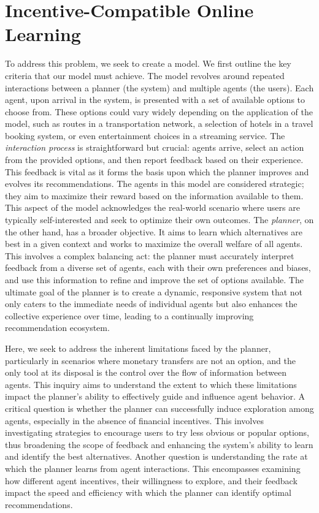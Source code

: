 \documentclass[
  letterpaper,
  numbers=noenddot,
  DIV=11]{scrreprt}
\theoremstyle{definition}
\theoremstyle{plain}
\theoremstyle{plain}
\theoremstyle{remark}
\begin{document}
\section{Incentive-Compatible Online
Learning}\label{incentive-compatible-online-learning}

To address this problem, we seek to create a model. We first outline the
key criteria that our model must achieve. The model revolves around
repeated interactions between a planner (the system) and multiple agents
(the users). Each agent, upon arrival in the system, is presented with a
set of available options to choose from. These options could vary widely
depending on the application of the model, such as routes in a
transportation network, a selection of hotels in a travel booking
system, or even entertainment choices in a streaming service. The
\emph{interaction process} is straightforward but crucial: agents
arrive, select an action from the provided options, and then report
feedback based on their experience. This feedback is vital as it forms
the basis upon which the planner improves and evolves its
recommendations. The agents in this model are considered strategic; they
aim to maximize their reward based on the information available to them.
This aspect of the model acknowledges the real-world scenario where
users are typically self-interested and seek to optimize their own
outcomes. The \emph{planner}, on the other hand, has a broader
objective. It aims to learn which alternatives are best in a given
context and works to maximize the overall welfare of all agents. This
involves a complex balancing act: the planner must accurately interpret
feedback from a diverse set of agents, each with their own preferences
and biases, and use this information to refine and improve the set of
options available. The ultimate goal of the planner is to create a
dynamic, responsive system that not only caters to the immediate needs
of individual agents but also enhances the collective experience over
time, leading to a continually improving recommendation ecosystem.

Here, we seek to address the inherent limitations faced by the planner,
particularly in scenarios where monetary transfers are not an option,
and the only tool at its disposal is the control over the flow of
information between agents. This inquiry aims to understand the extent
to which these limitations impact the planner's ability to effectively
guide and influence agent behavior. A critical question is whether the
planner can successfully induce exploration among agents, especially in
the absence of financial incentives. This involves investigating
strategies to encourage users to try less obvious or popular options,
thus broadening the scope of feedback and enhancing the system's ability
to learn and identify the best alternatives. Another question is
understanding the rate at which the planner learns from agent
interactions. This encompasses examining how different agent incentives,
their willingness to explore, and their feedback impact the speed and
efficiency with which the planner can identify optimal recommendations.
\end{document}

